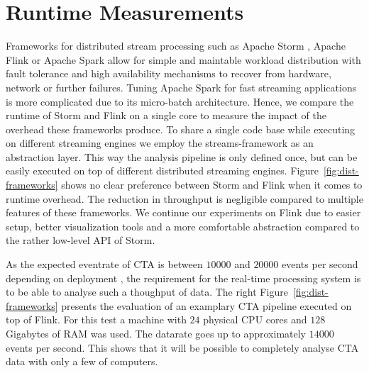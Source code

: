 \documentclass[11pt,twoside]{article}
\begin{document}
\section{Runtime Measurements}

Frameworks for distributed stream processing such as Apache Storm \cite{storm}, Apache Flink \cite{flink} or Apache Spark \cite{spark} allow for simple and maintable workload distribution with fault tolerance and high availability mechanisms to recover from hardware, network or further failures. 
Tuning Apache Spark for fast streaming applications is more complicated due to its micro-batch architecture. 
Hence, we compare the runtime of Storm and Flink on a single core to measure the impact of the overhead these frameworks produce. 
To share a single code base while executing on different streaming engines we employ the streams-framework \cite{streams} as an abstraction layer.
This way the analysis pipeline is only defined once, but can be easily executed on top of different distributed streaming engines. 
Figure~\ref{fig:dist-frameworks} shows no clear preference between Storm and Flink when it comes to runtime overhead. 
The reduction in throughput is negligible compared to multiple features of these frameworks.
We continue our experiments on Flink due to easier setup, better visualization tools and a more comfortable abstraction compared to the rather low-level API of Storm.

As the expected eventrate of CTA is between $10000$ and $20000$ events per second depending on deployment \cite{trigger}, the requirement for the real-time processing system is to be able to analyse such a thoughput of data. 
The right Figure~\ref{fig:dist-frameworks} presents the evaluation of an examplary CTA pipeline executed on top of Flink.
For this test a machine with $24$ physical CPU cores and $128$ Gigabytes of RAM was used.
The datarate goes up to approximately $14000$ events per second. 
This shows that it will be possible to completely analyse CTA data with only a few of computers.

\end{document}
